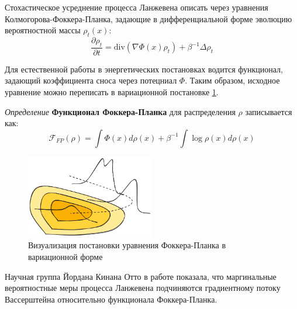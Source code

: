 Стохастическое усреднение процесса Ланжевена описать через уравнения Колмогорова-Фоккера-Планка, задающие
в дифференциальной форме эволюцию вероятностной массы $\rho_t(x)$:
\begin{equation}
    \frac{\partial \rho_t}{\partial t} = \text{div}(\nabla \Phi(x) \rho_t) + \beta^{-1} \Delta \rho_t
\end{equation}

Для естественной работы в энергетических постановках водится функционал, задающий коэффициента сноса через потецниал $\Phi$.
Таким образом, исходное уравнение можно переписать в вариационной постановке \ref{variation_fp}.

\textit{Определение} \textbf{Функционал Фоккера-Планка} для распределения $\rho$ записывается как: 
\begin{equation}
    \mathcal{F}_{FP}(\rho) = \int  \Phi(x) d\rho(x) + \beta^{-1} \int \log \rho(x) d \rho(x)
\end{equation}
\begin{figure}[h]
    \centering
    \includegraphics[width=0.5\textwidth]{assets/math/transport/functional.excalidraw.png}
    \caption{Визуализация постановки уравнения Фоккера-Планка в вариационной форме}
    \label{variation_fp}
\end{figure}
Научная группа Йордана Кинана Отто в работе \cite{jordan1998variational} показала, что маргинальные вероятностные меры процесса Ланжевена подчиняются 
градиентному потоку Вассерштейна относительно функционала Фоккера-Планка.

